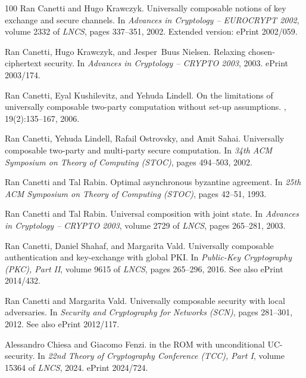 \documentclass[11pt,a4paper]{article}
\begin{document}
\begin{thebibliography}{100}
Ran Canetti and Hugo Krawczyk.
\newblock Universally composable notions of key exchange and secure channels.
\newblock In {\em Advances in Cryptology -- EUROCRYPT 2002}, volume 2332 of
  {\em LNCS}, pages 337--351, 2002.
\newblock Extended version: ePrint 2002/059.

Ran Canetti, Hugo Krawczyk, and Jesper~Buus Nielsen.
\newblock Relaxing chosen-ciphertext security.
\newblock In {\em Advances in Cryptology -- CRYPTO 2003}, 2003.
\newblock ePrint 2003/174.

Ran Canetti, Eyal Kushilevitz, and Yehuda Lindell.
\newblock On the limitations of universally composable two-party computation
  without set-up assumptions.
, 19(2):135--167, 2006.

Ran Canetti, Yehuda Lindell, Rafail Ostrovsky, and Amit Sahai.
\newblock Universally composable two-party and multi-party secure computation.
\newblock In {\em 34th ACM Symposium on Theory of Computing (STOC)}, pages
  494--503, 2002.

Ran Canetti and Tal Rabin.
\newblock Optimal asynchronous byzantine agreement.
\newblock In {\em 25th ACM Symposium on Theory of Computing (STOC)}, pages
  42--51, 1993.

Ran Canetti and Tal Rabin.
\newblock Universal composition with joint state.
\newblock In {\em Advances in Cryptology -- CRYPTO 2003}, volume 2729 of {\em
  LNCS}, pages 265--281, 2003.

Ran Canetti, Daniel Shahaf, and Margarita Vald.
\newblock Universally composable authentication and key-exchange with global
  {PKI}.
\newblock In {\em Public-Key Cryptography (PKC), Part II}, volume 9615 of {\em
  LNCS}, pages 265--296, 2016.
\newblock See also ePrint 2014/432.

Ran Canetti and Margarita Vald.
\newblock Universally composable security with local adversaries.
\newblock In {\em Security and Cryptography for Networks (SCN)}, pages
  281--301, 2012.
\newblock See also ePrint 2012/117.

Alessandro Chiesa and Giacomo Fenzi.
 in the {ROM} with unconditional {UC}-security.
\newblock In {\em 22nd Theory of Cryptography Conference (TCC), Part I}, volume
  15364 of {\em LNCS}, 2024.
\newblock ePrint 2024/724.


\end{thebibliography}
\end{document}
